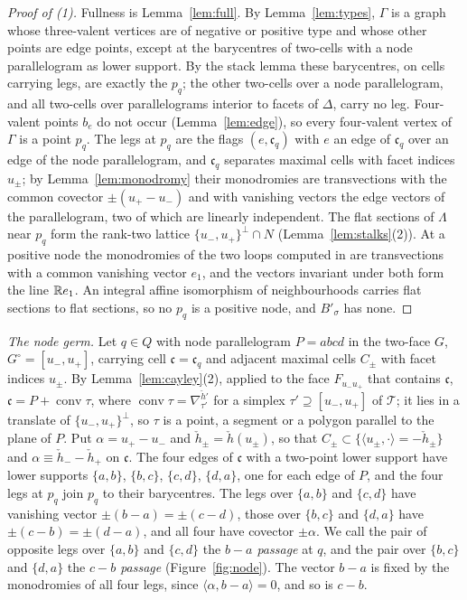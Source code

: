\begin{proof}[Proof of (1)]
Fullness is Lemma~\ref{lem:full}. By Lemma~\ref{lem:types}, $\Gamma$ is a graph whose three-valent vertices are of negative or
positive type and whose other points are edge points, except at the barycentres of two-cells with a node parallelogram as lower
support. By the stack lemma these barycentres, on cells carrying legs, are exactly the $p_q$; the other two-cells over a node
parallelogram, and all two-cells over parallelograms interior to facets of $\Delta$, carry no leg. Four-valent points $b_e$ do not
occur (Lemma~\ref{lem:edge}), so every four-valent vertex of $\Gamma$ is a point $p_q$. The legs at $p_q$ are the flags
$(e,\mathfrak c_q)$ with $e$ an edge of $\mathfrak c_q$ over an edge of the node parallelogram, and $\mathfrak c_q$ separates maximal
cells with facet indices $u_\pm$; by Lemma~\ref{lem:monodromy} their monodromies are transvections with the common covector
$\pm(u_+-u_-)$ and with vanishing vectors the edge vectors of the parallelogram, two of which are linearly independent. The flat
sections of $\Lambda$ near $p_q$ form the rank-two lattice $\{u_-,u_+\}^\perp\cap N$ (Lemma~\ref{lem:stalks}(2)). At a positive
node the monodromies of the two loops computed in \cite[Ex.~6.2]{CBM} are transvections with a common vanishing vector $e_1$, and
the vectors invariant under both form the line $\mathbb R e_1$. An integral affine isomorphism of neighbourhoods carries flat sections to
flat sections, so no $p_q$ is a positive node, and $B'_\sigma$ has none.
\end{proof}

\emph{The node germ.} Let $q\in Q$ with node parallelogram $P=abcd$ in the two-face $G$, $G^\circ=[u_-,u_+]$, carrying cell
$\mathfrak c=\mathfrak c_q$ and adjacent maximal cells $C_\pm$ with facet indices $u_\pm$. By Lemma~\ref{lem:cayley}(2), applied to
the face $F_{u_-u_+}$ that contains $\mathfrak c$, $\mathfrak c=P+\operatorname{conv}\tau$, where
$\operatorname{conv}\tau=\nabla^{\check h'}_{\tau'}$ for a simplex $\tau'\supseteq[u_-,u_+]$ of $\mathcal T$; it lies in a translate of
$\{u_-,u_+\}^\perp$, so $\tau$ is a point, a segment or a polygon parallel to the plane of $P$. Put
$\alpha=u_+-u_-$ and $\check h_\pm=\check h(u_\pm)$, so that $C_\pm\subset\{\langle u_\pm,\cdot\rangle=-\check h_\pm\}$ and
$\alpha\equiv\check h_--\check h_+$ on $\mathfrak c$. The four edges of $\mathfrak c$ with a two-point lower support have lower
supports $\{a,b\}$, $\{b,c\}$, $\{c,d\}$, $\{d,a\}$, one for each edge of $P$, and the four legs at $p_q$ join $p_q$ to their
barycentres. The legs over $\{a,b\}$ and $\{c,d\}$ have vanishing vector $\pm(b-a)=\pm(c-d)$, those over $\{b,c\}$ and $\{d,a\}$
have $\pm(c-b)=\pm(d-a)$, and all four have covector $\pm\alpha$. We call the pair of opposite legs over $\{a,b\}$ and $\{c,d\}$ the
\emph{$b-a$ passage} at $q$, and the pair over $\{b,c\}$ and $\{d,a\}$ the \emph{$c-b$ passage} (Figure~\ref{fig:node}). The vector
$b-a$ is fixed by the monodromies of all four legs, since $\langle\alpha,b-a\rangle=0$, and so is $c-b$.

